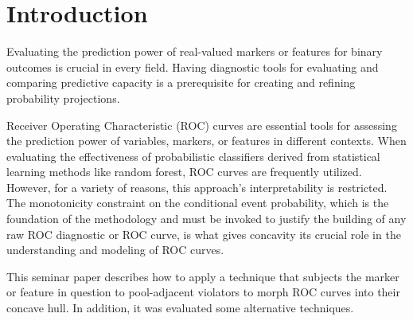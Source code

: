 \documentclass[a4paper,12pt]{article}
\numberwithin{equation}{section}
\begin{document}
%
%

\tableofcontents

\newpage

%
%

\setcounter{page}{1}  


\section{Introduction}
\label{Chapter:intro}  
Evaluating the prediction power of real-valued markers or features for binary outcomes is crucial in every field. Having diagnostic tools for evaluating and comparing predictive capacity is a prerequisite for creating and refining probability projections.\bigskip

Receiver Operating Characteristic (ROC) curves are essential tools for assessing the prediction power of variables, markers, or features in different contexts. When evaluating the effectiveness of probabilistic classifiers derived from statistical learning methods like random forest, ROC curves are frequently utilized. However, for a variety of reasons, this approach's interpretability is restricted. The monotonicity constraint on the conditional event probability, which is the foundation of the methodology and must be invoked to justify the building of any raw ROC diagnostic or ROC curve, is what gives concavity its crucial role in the understanding and modeling of ROC curves. \bigskip

This seminar paper describes how to apply a technique that subjects the marker or feature in question to pool-adjacent violators to morph ROC curves into their concave hull. In addition, it was evaluated some alternative techniques. \bigskip
\end{document}
